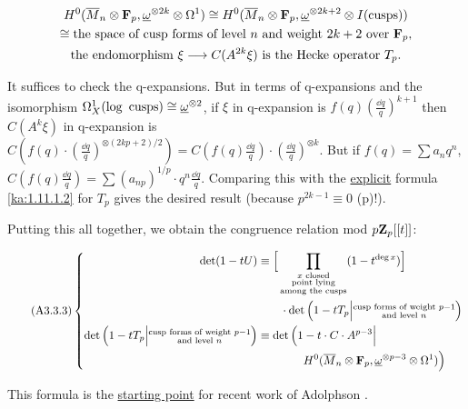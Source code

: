\[
\begin{gathered}
H^0(\Mbar_n\otimes\F_p,\w^{\otimes 2k}\otimes\Omega^1)\cong H^0(\Mbar_n\otimes\F_p,\w^{\otimes 2k+2}\otimes I(\text{cusps}))\\
\cong \text{the space of cusp forms of level }n\text{ and weight }2k+2\text{ over }\F_p,\\
\text{the endomorphism }\xi\longrightarrow C(A^{2k}\xi)\text{ is the Hecke operator\index{Hecke operator} }T_p .
\end{gathered}
\]

\begin{kaproof}
It suffices to check the q-expansions. But in terms of q-expansions and the
isomorphism $\Omega^1_X(\log\text{ cusps})\cong\underline{\omega}^{\otimes 2}$, if $\xi$ in
q-expansion is $f(q)\left(\frac{\dd q}{q}\right)^{k+1}$ then $C(A^k\xi)$ in
q-expansion is
$C(f(q)\cdot\left(\frac{\dd q}{q}\right)^{\otimes(2kp+2)/2}) =
C(f(q)\frac{\dd q}{q})\cdot\left(\frac{\dd q}{q}\right)^{\otimes k}$. But if
$f(q)=\sum a_nq^n$, $C(f(q)\frac{\dd q}{q}) =
\sum (a_{np})^{1/p}\cdot q^n\frac{\dd q}{q}$. Comparing this with the
\uline{explicit} formula \eqref{ka:1.11.1.2} for $T_p$ gives the desired result
(because $p^{2k-1}\equiv 0$ (p)!).
\end{kaproof}

Putting this all together, we obtain the congruence relation mod $p\mathbf{Z}_p[[t]]$:

\begin{equation}\tag{A3.3.3}\label{ka:A3.3.3}
\left\{
\begin{aligned}
\det(1-tU) &\equiv \Big[\prod_{\substack{x\text{ closed}\\ \text{point lying}\\\text{among the cusps}}}(1-t^{\deg x})\Big]\\
&\qquad\cdot\det\Big(1-tT_p\Big|\substack{\text{cusp forms of weight }p-1\\ \text{and level }n}\Big) \\
\det\Big(1-tT_p\Big|\substack{\text{cusp forms of weight }p-1\\ \text{and level }n}\Big) &\equiv \det\Big(1-t\cdot C\cdot A^{p-3}\Big|\\
&\qquad\qquad H^0(\overline{M}_n\otimes\mathbf{F}_p,\underline{\omega}^{\otimes p-3}\otimes\Omega^1)\Big)
\end{aligned}
\right.
\end{equation}

This formula is the \uline{starting point} for recent work of Adolphson \cite{adolphson73}.


